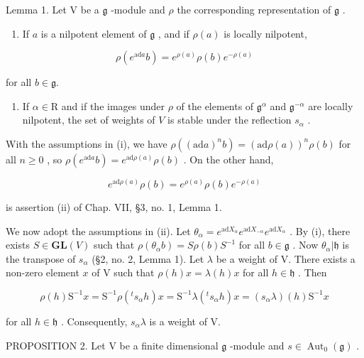 Lemma 1. Let \(\mathrm{V}\) be a \(\mathfrak{g}\) -module and \(\rho\) the corresponding representation of \(\mathfrak{g}\) .

\begin{enumerate}
\def\labelenumi{(\roman{enumi})}
\tightlist
\item
  If \(a\) is a nilpotent element of \(\mathfrak{g}\) , and if \(\rho(a)\) is locally nilpotent,
\end{enumerate}

\[
\rho (e ^ {\mathrm{ad} a} b) = e ^ {\rho (a)} \rho (b) e ^ {- \rho (a)}
\]

for all \(b \in \mathfrak{g}\).

\begin{enumerate}
\def\labelenumi{(\roman{enumi})}
\setcounter{enumi}{1}
\tightlist
\item
  If \(\alpha \in \mathrm{R}\) and if the images under \(\rho\) of the elements of \(\mathfrak{g}^{\alpha}\) and \(\mathfrak{g}^{-\alpha}\) are locally nilpotent, the set of weights of \(V\) is stable under the reflection \(s_{\alpha}\) .
\end{enumerate}

With the assumptions in (i), we have \(\rho((\mathrm{ad}a)^n b) = (\mathrm{ad}\rho(a))^n\rho(b)\) for all \(n\geq 0\) , so \(\rho(e^{\mathrm{ad}a}b) = e^{\mathrm{ad}\rho(a)}\rho(b)\) . On the other hand,

\[
e ^ {\mathrm{ad} \rho (a)} \rho (b) = e ^ {\rho (a)} \rho (b) e ^ {- \rho (a)}
\]

is assertion (ii) of Chap. VII, §3, no. 1, Lemma 1.

We now adopt the assumptions in (ii). Let \(\theta_{\alpha} = e^{\mathrm{ad}X_{\alpha}}e^{\mathrm{ad}X_{-\alpha}}e^{\mathrm{ad}X_{\alpha}}\) . By (i), there exists \(S\in \mathbf{GL}(V)\) such that \(\rho (\theta_{\alpha}b) = S\rho (b)S^{-1}\) for all \(b\in \mathfrak{g}\) . Now \(\theta_{\alpha}|\mathfrak{h}\) is the transpose of \(s_{\alpha}\) (§2, no. 2, Lemma 1). Let \(\lambda\) be a weight of V. There exists a non-zero element \(x\) of V such that \(\rho (h)x = \lambda (h)x\) for all \(h\in \mathfrak{h}\) . Then

\[
\rho (h) \mathrm{S} ^ {- 1} x = \mathrm{S} ^ {- 1} \rho (^ {t} s _ {\alpha} h) x = \mathrm{S} ^ {- 1} \lambda (^ {t} s _ {\alpha} h) x = (s _ {\alpha} \lambda) (h) \mathrm{S} ^ {- 1} x
\]

for all \(h \in \mathfrak{h}\) . Consequently, \(s_{\alpha}\lambda\) is a weight of V.

PROPOSITION 2. Let \(\mathrm{V}\) be a finite dimensional \(\mathfrak{g}\) -module and \(s \in \operatorname{Aut}_0(\mathfrak{g})\) .

